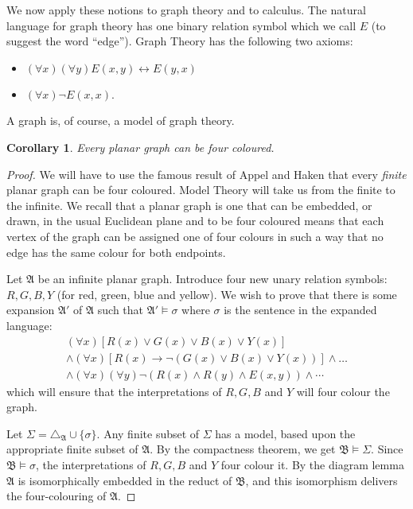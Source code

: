 \documentclass[titlepage, oneside]{amsbook}
\theoremstyle{plain}
\newtheorem{corollary}{Corollary}
\theoremstyle{definition}
\theoremstyle{remark}
\newcommand{\tria}[1]{\ensuremath{\triangle_{\mathfrak{#1}}}}
\newcommand{\ma}{\ensuremath{\mathfrak{A}}}
\newcommand{\mb}{\ensuremath{\mathfrak{B}}}
\begin{document}
We now apply these notions to graph theory and to calculus.  The natural
language for graph theory has one binary relation symbol which we call $E$
(to suggest the word ``edge''). Graph Theory has the following two axioms:
\begin{itemize}
\item $(\forall x ) (\forall y) E (x,y) \leftrightarrow E(y,x)$
\item $(\forall x) \neg E(x,x)$.
\end{itemize}

A graph is, of course, a model of graph theory.



\begin{corollary} Every planar graph can be four coloured.
\end{corollary}

\begin{proof} We will have to use the famous result of Appel and Haken
that every \emph{finite} planar graph can be four coloured. Model
Theory will take us from the finite to the infinite.  We recall
that a planar graph is one that can be embedded, or drawn, in the usual
Euclidean plane and to be four coloured means that each vertex of the
graph
can be assigned one of four colours in such a way that no edge has the
same colour for both endpoints.

Let $\ma$ be an infinite planar graph.  Introduce four new unary relation
symbols: $R, G , B,Y$ (for red, green, blue and yellow). We wish to
prove
that there is some expansion $\ma'$ of $\ma$ such that $\ma' \models
\sigma$ where $\sigma$ is the sentence in the expanded language:
\begin{multline*} 
 (\forall x) [R(x) \vee G(x) \vee B(x) \vee Y(x) ] \\
\wedge (\forall x) [R(x) \to \neg (G(x) \vee B(x) \vee Y(x))] \wedge
\dots \\
\wedge (\forall x)
(\forall y) \neg (R(x) 
\wedge R(y) \wedge E(x,y)) \wedge \cdots 
\end{multline*} 
which will ensure that the interpretations of $R,G,B$ and $Y$ will four
colour the graph.

Let $\Sigma = \tria A \cup \{ \sigma \}$.  Any finite subset of $\Sigma$
has a model, based upon the appropriate finite subset of $\ma$.  By the
compactness theorem, we get $\mb \models \Sigma$.  Since $\mb \models
\sigma$, the interpretations of $R,G,B $ and $Y$ four colour it.  By the
diagram lemma $\ma$ is isomorphically embedded in the reduct of $\mb$, and
this isomorphism delivers the four-colouring of $\ma$.

\end{proof}
\end{document}
